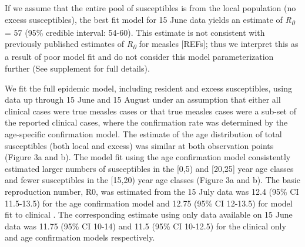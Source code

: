 If we assume that the entire pool of susceptibles is from the local population (no excess susceptibles), the best
fit model for 15 June data yields an estimate of
\emph{R\textsubscript{0}} = 57 (95\% credible interval: 54-60). This
estimate is not consistent with previously published estimates of
\emph{R\textsubscript{0}} for measles {[}REFs{]}; thus we interpret this
as a result of poor model fit and do not consider this model parameterization further (See supplement for full details).

We fit the full epidemic model, including resident and excess
susceptibles, using data up through 15 June and 15 August under an
assumption that either all clinical cases were true measles cases or
that true measles cases were a sub-set of the reported clinical cases,
where the confirmation rate was determined by the age-specific
confirmation model. The estimate of the age distribution of total
susceptibles (both local and excess) was similar at both observation
points (Figure 3a and b). The model fit using the age confirmation model
consistently estimated larger numbers of susceptibles in the {[}0,5) and
{[}20,25{]} year age classes and fewer susceptibles in the {[}15,20)
year age classes (Figure 3a and b). The basic reproduction number, R0,
was estimated from the 15 July data was 12.4 (95\% CI 11.5-13.5) for the
age confirmation model and 12.75 (95\% CI 12-13.5) for model fit to
clinical . The corresponding estimate using only data available on 15
June data was 11.75 (95\% CI 10-14) and 11.5 (95\% CI 10-12.5) for the
clinical only and age confirmation models respectively.